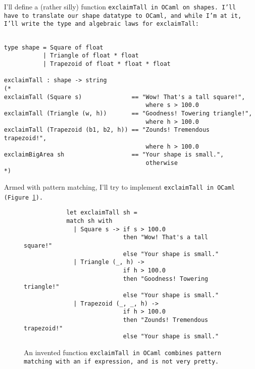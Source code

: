 \documentclass[manuscript,screen,review, 12pt, nonacm]{acmart}
\begin{document}
    I'll define a (rather silly) function \tt{exclaimTall} in OCaml on
    \tt{shape}s. I'll have to translate our \tt{shape} datatype to OCaml, and
    while I'm at it, I'll write the type and algebraic laws for
    \tt{exclaimTall}:

    \begin{minipage}[t]{\textwidth}        
        \centering 
        \begin{verbatim}

type shape = Square of float 
           | Triangle of float * float
           | Trapezoid of float * float * float

exclaimTall : shape -> string 
(*
exclaimTall (Square s)              == "Wow! That's a tall square!", 
                                        where s > 100.0
exclaimTall (Triangle (w, h))       == "Goodness! Towering triangle!",
                                        where h > 100.0
exclaimTall (Trapezoid (b1, b2, h)) == "Zounds! Tremendous trapezoid!", 
                                        where h > 100.0
exclaimBigArea sh                   == "Your shape is small.", 
                                        otherwise
*)
    \end{verbatim}
    \end{minipage}

    Armed with pattern matching, I'll try to implement \tt{exclaimTall} in OCaml
    (Figure~\ref{fig:ifexclaimtall}).

    \begin{figure}[ht]
        \begin{verbatim}
            let exclaimTall sh =
            match sh with 
              | Square s -> if s > 100.0 
                            then "Wow! That's a tall square!"
                            else "Your shape is small." 
              | Triangle (_, h) -> 
                            if h > 100.0 
                            then "Goodness! Towering triangle!"
                            else "Your shape is small." 
              | Trapezoid (_, _, h) -> 
                            if h > 100.0
                            then "Zounds! Tremendous trapezoid!"
                            else "Your shape is small." 
            \end{verbatim}    
        \caption{An invented function \tt{exclaimTall} in OCaml combines pattern
        matching with an \tt{if} expression, and is not very pretty.}   
        \label{fig:ifexclaimtall}
    \end{figure}
    
\end{document}
